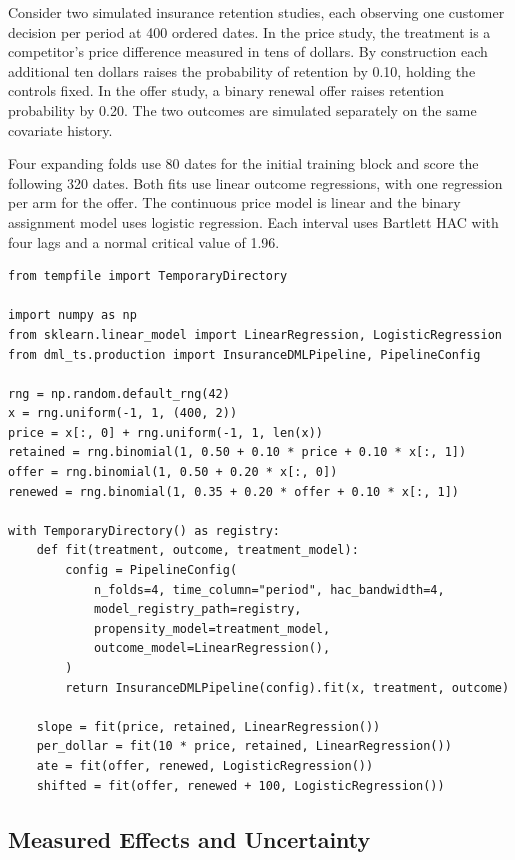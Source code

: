Consider two simulated insurance retention studies, each observing one customer decision per period at 400 ordered dates. In the price study, the treatment is a competitor's price difference measured in tens of dollars. By construction each additional ten dollars raises the probability of retention by 0.10, holding the controls fixed. In the offer study, a binary renewal offer raises retention probability by 0.20. The two outcomes are simulated separately on the same covariate history.

Four expanding folds use 80 dates for the initial training block and score the following 320 dates. Both fits use linear outcome regressions, with one regression per arm for the offer. The continuous price model is linear and the binary assignment model uses logistic regression. Each interval uses Bartlett HAC with four lags and a normal critical value of 1.96.

\begin{verbatim}
from tempfile import TemporaryDirectory

import numpy as np
from sklearn.linear_model import LinearRegression, LogisticRegression
from dml_ts.production import InsuranceDMLPipeline, PipelineConfig

rng = np.random.default_rng(42)
x = rng.uniform(-1, 1, (400, 2))
price = x[:, 0] + rng.uniform(-1, 1, len(x))
retained = rng.binomial(1, 0.50 + 0.10 * price + 0.10 * x[:, 1])
offer = rng.binomial(1, 0.50 + 0.20 * x[:, 0])
renewed = rng.binomial(1, 0.35 + 0.20 * offer + 0.10 * x[:, 1])

with TemporaryDirectory() as registry:
    def fit(treatment, outcome, treatment_model):
        config = PipelineConfig(
            n_folds=4, time_column="period", hac_bandwidth=4,
            model_registry_path=registry,
            propensity_model=treatment_model,
            outcome_model=LinearRegression(),
        )
        return InsuranceDMLPipeline(config).fit(x, treatment, outcome)

    slope = fit(price, retained, LinearRegression())
    per_dollar = fit(10 * price, retained, LinearRegression())
    ate = fit(offer, renewed, LogisticRegression())
    shifted = fit(offer, renewed + 100, LogisticRegression())
\end{verbatim}

\subsection{Measured Effects and Uncertainty}

